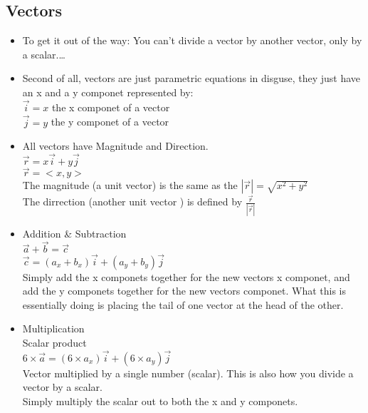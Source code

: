 \documentclass{article}
\begin{document}
  \subsection*{\color{BrickRed}Vectors}
  \begin{itemize}
    \item To get it out of the way: You can't divide a
      vector by another vector, only by a scalar.\ldots\\
    \item Second of all, vectors are just parametric equations in
      disguse, they just have an x and a y componet represented
      by:\\
    \subitem $\vec{i}=x$ the x componet of a vector\\
    \subitem $\vec{j}=y$ the y componet of a vector\\
    \item All vectors have Magnitude and Direction.\\
      \subitem $ \vec{r}=x\vec{i}+y\vec{j} $\\
      \subitem $ \vec{r}=<x,y>$\\
        \subsubitem The magnitude (a unit vector) is the same as the $|\vec{r}|=\sqrt{x^{2}+y^{2}}$\\
	\subsubitem The dirrection (another unit vector ) is defined by $\frac{\vec{r}}{|\vec{r}|}$\\
    \item Addition \& Subtraction\\
      \subitem $\vec{a}+\vec{b}=\vec{c}$\\
      $\vec{c}=(a_x+b_x)\vec{i}+(a_y+b_y)\vec{j}$\\
      \subitem Simply add the x componets together for the new
      vectors x componet, and add the y componets together for the new
      vectors componet. What this is essentially doing is placing the tail of
      one vector at the head of the other.\\
    \item Multiplication\\
      \subitem Scalar product\\
      	\subsubitem $6 \times \vec{a}=(6\times
	a_x)\vec{i}+(6\times a_y)\vec{j}$\\
        \subsubitem Vector multiplied by a single number
	(scalar). This is also how you divide a vector by a
	scalar.\\
        \subsubitem Simply multiply the scalar out to both the x
	and y componets.\\

\end{itemize}
\end{document}
